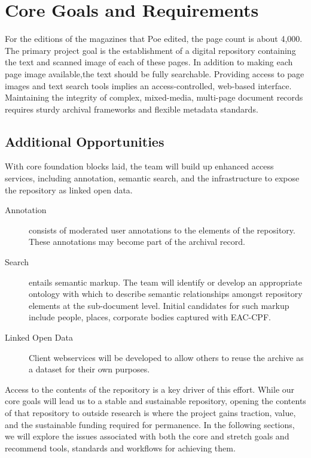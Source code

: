 \section{Core Goals and Requirements}
For the editions of the magazines that Poe edited, the page count is about 4,000. The primary project goal is the establishment of a digital repository containing the text and scanned image of each of these pages. In addition to making each page image available,the text should be fully searchable. Providing access to page images and text search tools implies an access-controlled, web-based interface. Maintaining the integrity of complex, mixed-media, multi-page document records requires sturdy archival frameworks and flexible metadata standards. 


\subsection{Additional Opportunities}
With core foundation blocks laid, the team will build up enhanced access services, including annotation, semantic search, and the infrastructure to expose the repository as linked open data. 
\begin{description}
  \item[Annotation] consists of moderated user annotations to the elements of the repository. These annotations may become part of the archival record.   
  \item[Search] entails semantic markup. The team will identify or develop an appropriate ontology with which to describe semantic relationships amongst repository elements at the sub-document level. Initial candidates for such markup include people, places, corporate bodies captured with EAC-CPF. 
  \item[Linked Open Data] Client webservices will be developed  to allow others to reuse the archive as a dataset for their own purposes. 
\end{description}
Access to the contents of the repository is a key driver of this effort. While our core goals will lead us to a stable and sustainable repository, opening the contents of that repository to outside research is where the project gains traction, value, and the sustainable funding required for permanence. In the following sections, we will explore the issues associated with both the core and stretch goals and recommend tools, standards and workflows for achieving them.